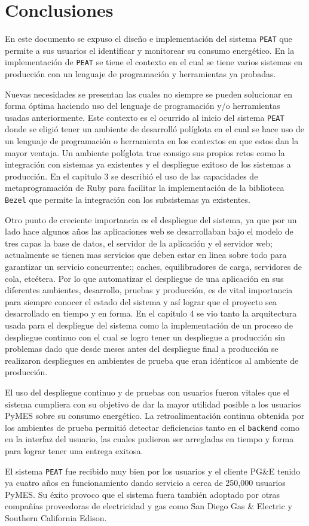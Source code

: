 \chapter{Conclusiones}

En este documento se expuso el diseño e implementación del sistema \texttt{PEAT} que
permite a sus usuarios el identificar y monitorear su consumo energético. En la
implementación de \texttt{PEAT} se tiene el contexto en el cual se tiene varios
sistemas en producción con un lenguaje de programación y herramientas ya
probadas.

Nuevas necesidades se presentan las cuales no siempre se pueden solucionar en
forma óptima haciendo uso del lenguaje de programación y/o herramientas usadas
anteriormente. Este contexto es el ocurrido al inicio del sistema \texttt{PEAT}
donde se eligió tener un ambiente de desarrolló políglota en el cual se hace uso
de un lenguaje de programación o herramienta en los contextos en que estos dan la
mayor ventaja. Un ambiente políglota trae consigo sus propios retos como la
integración con sistemas ya existentes y el despliegue exitoso de los sistemas a
producción. En el capitulo 3 se describió el uso de las capacidades de
metaprogramación de Ruby para facilitar la implementación de la biblioteca
\texttt{Bezel} que permite la integración con los subsistemas ya existentes.

Otro punto de creciente importancia es el despliegue del sistema, ya que por
un lado hace algunos años las aplicaciones web se desarrollaban bajo el modelo
de tres capas la base de datos, el servidor de la aplicación y el servidor web;
actualmente se tienen mas servicios que deben estar en linea sobre todo para
garantizar un servicio concurrente:; caches, equilibradores de carga, servidores
de cola, etcétera. Por lo que automatizar el despliegue de una aplicación en sus
diferentes ambientes, desarrollo, pruebas y producción, es de vital importancia
para siempre conocer el estado del sistema y así lograr que el proyecto sea
desarrollado en tiempo y en forma. En el capitulo 4 se vio tanto la arquitectura
usada para el despliegue del sistema como la implementación de un proceso
de despliegue continuo con el cual se logro tener un despliegue a producción sin
problemas dado que desde meses antes del despliegue final a producción se
realizaron despliegues en ambientes de prueba que eran idénticos al ambiente de
producción.

El uso del despliegue continuo y de pruebas con usuarios fueron vitales
que el sistema cumpliera con su objetivo de dar la mayor utilidad posible
a los usuarios PyMES sobre su consumo energético. La retroalimentación continua
obtenida por los ambientes de prueba permitió detectar deficiencias tanto en el
\texttt{backend} como en la interfaz del usuario, las cuales pudieron ser arregladas
en tiempo y forma para lograr tener una entrega exitosa.

El sistema \texttt{PEAT} fue recibido muy bien por los usuarios y el cliente PG\&E
tenido ya cuatro años en funcionamiento dando servicio a cerca de 250,000 usuarios
PyMES\cite{30_pge_annual_report}. Su éxito provoco que el sistema fuera
también adoptado por otras compañías proveedoras de electricidad y gas como
San Diego Gas \& Electric y Southern California Edison.

